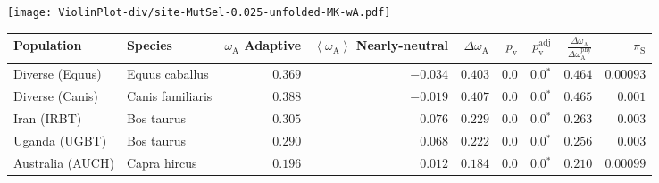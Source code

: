\begin{center}
\texttt{[image: ViolinPlot-div/site-MutSel-0.025-unfolded-MK-wA.pdf]} 
\begin{adjustbox}{width = 1\textwidth}
\begin{tabular}{|l|l|r|r|r|r|r|r|r|}
\toprule
                     Population &              Species & \specialcell{$\omega_{\mathrm{A}}$ \\ Adaptive} & \specialcell{$\left< \omega_{\mathrm{A}} \right>$ \\ Nearly-neutral} & $\Delta \omega_{\mathrm{A}} $ & $p_{\mathrm{v}}$ & $p_{\mathrm{v}}^{\mathrm{adj}}$ & $\frac{\Delta\omega_{\mathrm{A}}}{\Delta\omega_{\mathrm{A}}^{\mathrm{phy}}}$ & $\pi_{\textrm{S}}$ \\
\midrule
                Diverse (Equus) &       Equus caballus &                                        $ 0.369$ &                                           $-0.034$ &                      $ 0.403$ &            $0.0$ &                  $\bm{0.0{^*}}$ &                                           $ 0.464$ &          $0.00093$ \\
                Diverse (Canis) &     Canis familiaris &                                        $ 0.388$ &                                           $-0.019$ &                      $ 0.407$ &            $0.0$ &                  $\bm{0.0{^*}}$ &                                           $ 0.465$ &           $ 0.001$ \\
                    Iran (IRBT) &           Bos taurus &                                        $ 0.305$ &                                           $ 0.076$ &                      $ 0.229$ &            $0.0$ &                  $\bm{0.0{^*}}$ &                                           $ 0.263$ &           $ 0.003$ \\
                  Uganda (UGBT) &           Bos taurus &                                        $ 0.290$ &                                           $ 0.068$ &                      $ 0.222$ &            $0.0$ &                  $\bm{0.0{^*}}$ &                                           $ 0.256$ &           $ 0.003$ \\
               Australia (AUCH) &         Capra hircus &                                        $ 0.196$ &                                           $ 0.012$ &                      $ 0.184$ &            $0.0$ &                  $\bm{0.0{^*}}$ &                                           $ 0.210$ &          $0.00099$ \\

\end{tabular}
\end{adjustbox}
\end{center}
